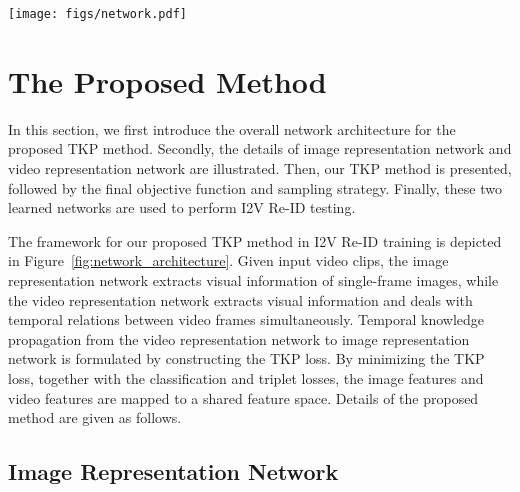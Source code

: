 \documentclass[10pt,twocolumn,letterpaper]{article}
\begin{document}
\begin{figure*}
   \centering
   \texttt{[image: figs/network.pdf]}\\
   \vspace{-5pt}
   \caption{The framework of TKP method in I2V Re-ID training.
  	SAP and TAP represent spatial average pooling and temporal average pooling respectively.
   The classification loss and triplet loss are used to guide image-to-video representation learning.
   The blue arrow represents the process of TKP via features, while the green arrow represents the process of TKP via cross sample distances.
   And the red arrow denotes the back propagation process of TKP loss.
   The representation learning and temporal knowledge transferring are trained simultaneously.
   Best viewed in color. }
   \vspace{-15pt}
   \label{fig:network_architecture}
\end{figure*}


\section{The Proposed Method}
In this section, we first introduce the overall network architecture for the proposed TKP method.
Secondly, the details of image representation network and video representation network are illustrated.
Then, our TKP method is presented, followed by the final objective function and sampling strategy.
Finally, these two learned networks are used to perform I2V Re-ID testing.

The framework for our proposed TKP method in I2V Re-ID training is depicted in Figure~\ref{fig:network_architecture}.
Given input video clips, the image representation network extracts visual information of single-frame images, while the video representation network extracts visual information and deals with temporal relations between video frames simultaneously.
Temporal knowledge propagation from the video representation network to image representation network is formulated by constructing the TKP loss.
By minimizing the TKP loss, together with the classification and triplet losses, the image features and video features are mapped to a shared feature space.
Details of the proposed method are given as follows.


\subsection{Image Representation Network}
\label{sec:imagemodel}
\end{document}
